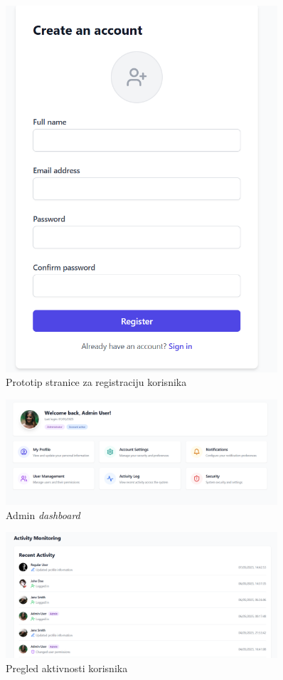 \begin{figure}[H]
    \centering
    \includegraphics[width=0.9\textwidth]{Slike/fz3.4.png}
    \caption{Prototip stranice za registraciju korisnika}
    \label{fig:fz3.4}
\end{figure}

\begin{figure}[H]
    \centering
    \includegraphics[width=0.9\textwidth]{Slike/fz3.5.png}
    \caption{Admin \textit{dashboard}}
    \label{fig:fz3.5}
\end{figure}

\begin{figure}[H]
    \centering
    \includegraphics[width=0.9\textwidth]{Slike/fz3.6.png}
    \caption{Pregled aktivnosti korisnika}
    \label{fig:fz3.6}
\end{figure}

